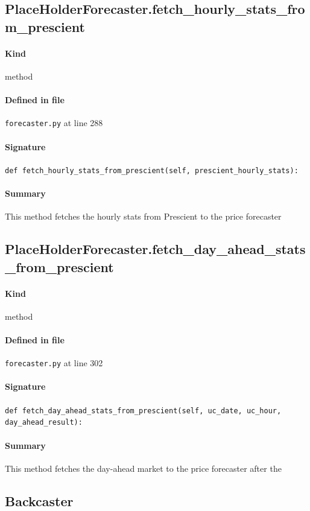 \documentclass[11pt]{report}
\begin{document}
\subsection{PlaceHolderForecaster.fetch\_hourly\_stats\_from\_prescient}
\label{def:forecaster.py:PlaceHolderForecaster.fetch_hourly_stats_from_prescient:L288}
\paragraph{Kind} method
\paragraph{Defined in file} \texttt{forecaster.py} at line 288
\paragraph{Signature} \texttt{def fetch\_hourly\_stats\_from\_prescient(self, prescient\_hourly\_stats):}
\paragraph{Summary} This method fetches the hourly stats from Prescient to the price forecaster
\subsection{PlaceHolderForecaster.fetch\_day\_ahead\_stats\_from\_prescient}
\label{def:forecaster.py:PlaceHolderForecaster.fetch_day_ahead_stats_from_prescient:L302}
\paragraph{Kind} method
\paragraph{Defined in file} \texttt{forecaster.py} at line 302
\paragraph{Signature} \texttt{def fetch\_day\_ahead\_stats\_from\_prescient(self, uc\_date, uc\_hour, day\_ahead\_result):}
\paragraph{Summary} This method fetches the day-ahead market to the price forecaster after the
\subsection{Backcaster}
\label{def:forecaster.py:Backcaster:L321}
\end{document}
